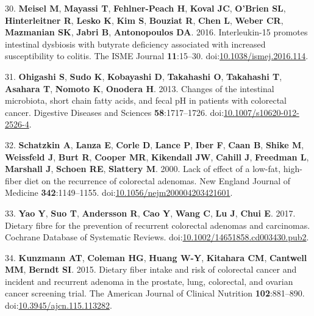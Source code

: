 \documentclass[11pt,]{article}
\begin{document}
\leavevmode\hypertarget{ref-Meisel2016}{}%
30. \textbf{Meisel M}, \textbf{Mayassi T}, \textbf{Fehlner-Peach H},
\textbf{Koval JC}, \textbf{O'Brien SL}, \textbf{Hinterleitner R},
\textbf{Lesko K}, \textbf{Kim S}, \textbf{Bouziat R}, \textbf{Chen L},
\textbf{Weber CR}, \textbf{Mazmanian SK}, \textbf{Jabri B},
\textbf{Antonopoulos DA}. 2016. Interleukin-15 promotes intestinal
dysbiosis with butyrate deficiency associated with increased
susceptibility to colitis. The ISME Journal \textbf{11}:15--30.
doi:\href{https://doi.org/10.1038/ismej.2016.114}{10.1038/ismej.2016.114}.

\leavevmode\hypertarget{ref-Ohigashi2013}{}%
31. \textbf{Ohigashi S}, \textbf{Sudo K}, \textbf{Kobayashi D},
\textbf{Takahashi O}, \textbf{Takahashi T}, \textbf{Asahara T},
\textbf{Nomoto K}, \textbf{Onodera H}. 2013. Changes of the intestinal
microbiota, short chain fatty acids, and fecal pH in patients with
colorectal cancer. Digestive Diseases and Sciences
\textbf{58}:1717--1726.
doi:\href{https://doi.org/10.1007/s10620-012-2526-4}{10.1007/s10620-012-2526-4}.

\leavevmode\hypertarget{ref-Schatzkin2000}{}%
32. \textbf{Schatzkin A}, \textbf{Lanza E}, \textbf{Corle D},
\textbf{Lance P}, \textbf{Iber F}, \textbf{Caan B}, \textbf{Shike M},
\textbf{Weissfeld J}, \textbf{Burt R}, \textbf{Cooper MR},
\textbf{Kikendall JW}, \textbf{Cahill J}, \textbf{Freedman L},
\textbf{Marshall J}, \textbf{Schoen RE}, \textbf{Slattery M}. 2000. Lack
of effect of a low-fat, high-fiber diet on the recurrence of colorectal
adenomas. New England Journal of Medicine \textbf{342}:1149--1155.
doi:\href{https://doi.org/10.1056/nejm200004203421601}{10.1056/nejm200004203421601}.

\leavevmode\hypertarget{ref-Yao2017}{}%
33. \textbf{Yao Y}, \textbf{Suo T}, \textbf{Andersson R}, \textbf{Cao
Y}, \textbf{Wang C}, \textbf{Lu J}, \textbf{Chui E}. 2017. Dietary fibre
for the prevention of recurrent colorectal adenomas and carcinomas.
Cochrane Database of Systematic Reviews.
doi:\href{https://doi.org/10.1002/14651858.cd003430.pub2}{10.1002/14651858.cd003430.pub2}.

\leavevmode\hypertarget{ref-Kunzmann2015}{}%
34. \textbf{Kunzmann AT}, \textbf{Coleman HG}, \textbf{Huang W-Y},
\textbf{Kitahara CM}, \textbf{Cantwell MM}, \textbf{Berndt SI}. 2015.
Dietary fiber intake and risk of colorectal cancer and incident and
recurrent adenoma in the prostate, lung, colorectal, and ovarian cancer
screening trial. The American Journal of Clinical Nutrition
\textbf{102}:881--890.
doi:\href{https://doi.org/10.3945/ajcn.115.113282}{10.3945/ajcn.115.113282}.
\end{document}
